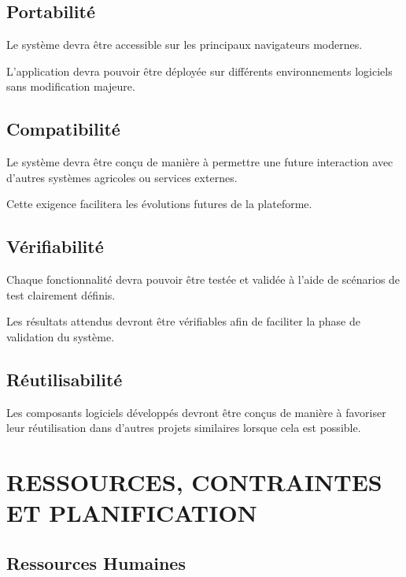 \documentclass[12pt,a4paper]{report}
\begin{document}
\section{Portabilité}\label{portabilituxe9}

Le système devra être accessible sur les principaux navigateurs
modernes.

L'application devra pouvoir être déployée sur différents environnements
logiciels sans modification majeure.

\section{Compatibilité}\label{compatibilituxe9}

Le système devra être conçu de manière à permettre une future
interaction avec d'autres systèmes agricoles ou services externes.

Cette exigence facilitera les évolutions futures de la plateforme.

\section{Vérifiabilité}\label{vuxe9rifiabilituxe9}

Chaque fonctionnalité devra pouvoir être testée et validée à l'aide de
scénarios de test clairement définis.

Les résultats attendus devront être vérifiables afin de faciliter la
phase de validation du système.

\section{Réutilisabilité}\label{ruxe9utilisabilituxe9}

Les composants logiciels développés devront être conçus de manière à
favoriser leur réutilisation dans d'autres projets similaires lorsque
cela est possible.

\chapter{RESSOURCES, CONTRAINTES ET
PLANIFICATION}\label{chapitre-6-ressources-contraintes-et-planification}

\section{Ressources Humaines}\label{ressources-humaines}
\end{document}
